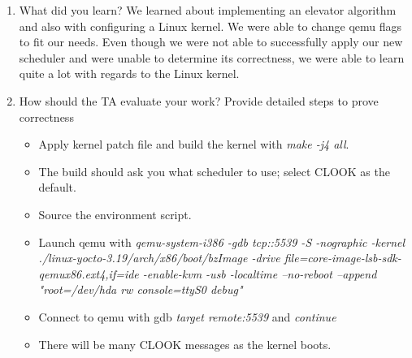 \documentclass[letterpaper,10pt,draftclsnofoot,onecolumn,titlepage]{IEEEtran}
\begin{document}
\begin{enumerate}
                \item What did you learn?
We learned about implementing an elevator algorithm and also with configuring a Linux kernel. We were able to change qemu flags to fit our needs.
Even though we were not able to successfully apply our new scheduler and were unable to determine its correctness, we were able to learn quite a lot with regards to the Linux kernel. 

                \item How should the TA evaluate your work? Provide detailed steps to prove correctness 
			\begin{itemize}
			\item Apply kernel patch file and build the kernel with \textit{make -j4 all}.
			\item The build should ask you what scheduler to use; select CLOOK as the default.
			\item Source the environment script.
			\item Launch qemu with \textit{qemu-system-i386 -gdb tcp::5539 -S -nographic -kernel ./linux-yocto-3.19/arch/x86/boot/bzImage -drive file=core-image-lsb-sdk-qemux86.ext4,if=ide -enable-kvm -usb -localtime --no-reboot --append "root=/dev/hda rw console=ttyS0 debug"}
			\item Connect to qemu with gdb \textit{target remote:5539} and \textit{continue}
			\item There will be many CLOOK messages as the kernel boots.
			\end{itemize}
\end{enumerate}
\end{document}

